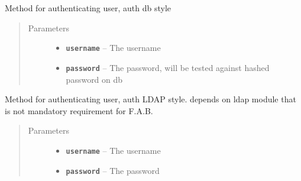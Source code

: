 \documentclass[letterpaper,10pt,english]{sphinxmanual}
\begin{document}
\begin{fulllineitems}
\begin{fulllineitems}
\label{api:flask.ext.appbuilder.security.manager.BaseSecurityManager.auth_user_db}
Method for authenticating user, auth db style
\begin{quote}\begin{description}
\item[{Parameters}] \leavevmode\begin{itemize}
\item {} 
\textbf{\texttt{username}} -- The username

\item {} 
\textbf{\texttt{password}} -- The password, will be tested against hashed password on db

\end{itemize}

\end{description}\end{quote}

\end{fulllineitems}


\begin{fulllineitems}
\label{api:flask.ext.appbuilder.security.manager.BaseSecurityManager.auth_user_ldap}
Method for authenticating user, auth LDAP style.
depends on ldap module that is not mandatory requirement
for F.A.B.
\begin{quote}\begin{description}
\item[{Parameters}] \leavevmode\begin{itemize}
\item {} 
\textbf{\texttt{username}} -- The username

\item {} 
\textbf{\texttt{password}} -- The password

\end{itemize}

\end{description}\end{quote}

\end{fulllineitems}



\end{fulllineitems}
\end{document}
